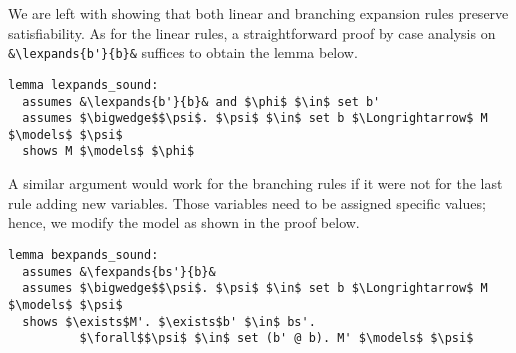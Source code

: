 \documentclass[sigplan,10pt,anonymous,review]{acmart}
\newcommand{\lefttrianglebar}{\mathrel{\tikz[baseline]{\draw (1ex, 0.75ex) -- (0, 1.25ex) -- (0, 0.25ex) -- cycle; \draw (0, 0.75ex) -- (1ex, 0.75ex);}}}
\newcommand{\lefttriangle}{\mathrel{\tikz[baseline]{\draw (1ex, 0.75ex) -- (0, 1.25ex) -- (0, 0.25ex) -- cycle;}}}
\newcommand{\lexpands}[2]{#1 $\lefttriangle$ #2}
\newcommand{\fexpands}[2]{#1 $\lefttrianglebar$ #2}
\begin{document}
\noindent We are left with showing that both linear and branching expansion rules preserve satisfiability.
As for the linear rules, a straightforward proof by case analysis on \lstinline!&\lexpands{b'}{b}&! suffices to obtain the lemma below.
\begin{lstlisting}[label={lst:lexpands_sound}]
lemma lexpands_sound:
  assumes &\lexpands{b'}{b}& and $\phi$ $\in$ set b'
  assumes $\bigwedge$$\psi$. $\psi$ $\in$ set b $\Longrightarrow$ M $\models$ $\psi$
  shows M $\models$ $\phi$
\end{lstlisting}
A similar argument would work for the branching rules if it were not for the last rule adding new variables.
Those variables need to be assigned specific values; hence, we modify the model as shown in the proof below.
\begin{lstlisting}[belowskip=0pt, label={lst:bexpands_sound}]
lemma bexpands_sound:
  assumes &\fexpands{bs'}{b}&
  assumes $\bigwedge$$\psi$. $\psi$ $\in$ set b $\Longrightarrow$ M $\models$ $\psi$
  shows $\exists$M'. $\exists$b' $\in$ bs'.
          $\forall$$\psi$ $\in$ set (b' @ b). M' $\models$ $\psi$
\end{lstlisting}
\end{document}
